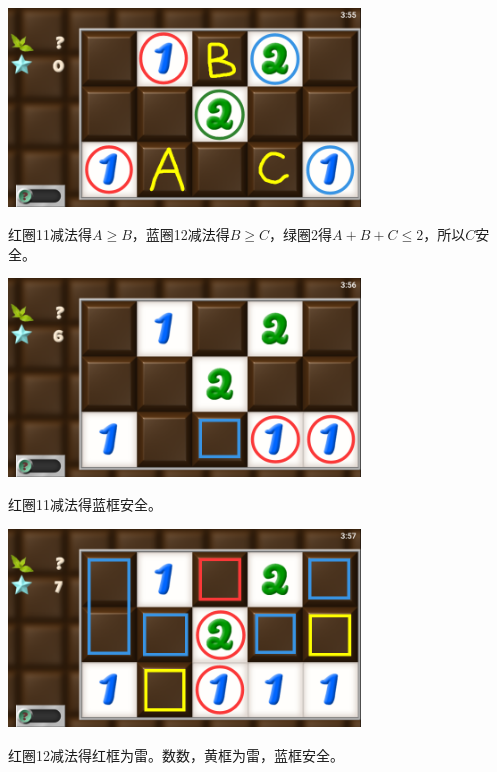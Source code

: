 \subsection{} %
\begin{center}
    \includegraphics[width=0.7\textwidth]{puzzle/98-1.png}
\end{center}
红圈11减法得$A\ge B$，蓝圈12减法得$B\ge C$，绿圈2得$A+B+C\le 2$，所以$C$安全。
\begin{center}
    \includegraphics[width=0.7\textwidth]{puzzle/98-2.png}
\end{center}
红圈11减法得蓝框安全。
\begin{center}
    \includegraphics[width=0.7\textwidth]{puzzle/98-3.png}
\end{center}
红圈12减法得红框为雷。数数，黄框为雷，蓝框安全。

